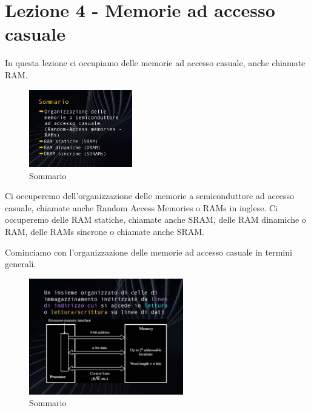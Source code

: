 \chapter{Lezione 4 - Memorie ad accesso casuale}

In questa lezione ci occupiamo delle memorie ad accesso casuale, anche chiamate RAM.

\FloatBarrier
\begin{figure}[H]
  \centering
  \includegraphics[width=0.40\textwidth,
                    trim=40 40 10 40, %
                    clip]
                    {images/Lez04_p01_fig_02.png}
  \caption{Sommario}
  \label{fig:Lez04_p01_fig_02}
\end{figure}
\FloatBarrier
\noindent

Ci occuperemo dell'organizzazione delle memorie a semiconduttore ad accesso casuale, chiamate anche Random Access Memories o RAMs in inglese.
Ci occuperemo delle RAM statiche, chiamate anche SRAM, delle RAM dinamiche o RAM, delle RAMs sincrone o chiamate anche SRAM.

Cominciamo con l'organizzazione delle memorie ad accesso casuale in termini generali.

\FloatBarrier
\begin{figure}[H]
  \centering
  \includegraphics[width=0.60\textwidth,
                    trim=40 20 10 40, %
                    clip]
                    {images/Lez04_p01_fig_04.png}
  \caption{Sommario}
  \label{fig:Lez04_p01_fig_04}
\end{figure}
\FloatBarrier
\noindent

